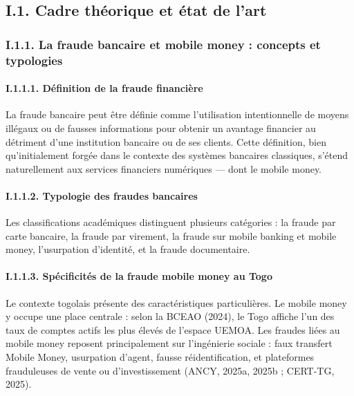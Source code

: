 \documentclass[
  12pt,
]{article}
\begin{document}
\subsection{I.1. Cadre théorique et état de
l’art}\label{i.1.-cadre-thuxe9orique-et-uxe9tat-de-lart}

\subsubsection{I.1.1. La fraude bancaire et mobile money : concepts et
typologies}\label{i.1.1.-la-fraude-bancaire-et-mobile-money-concepts-et-typologies}

\paragraph{I.1.1.1. Définition de la fraude
financière}\label{i.1.1.1.-duxe9finition-de-la-fraude-financiuxe8re}

La fraude bancaire peut être définie comme l’utilisation intentionnelle
de moyens illégaux ou de fausses informations pour obtenir un avantage
financier au détriment d’une institution bancaire ou de ses clients.
Cette définition, bien qu’initialement forgée dans le contexte des
systèmes bancaires classiques, s’étend naturellement aux services
financiers numériques — dont le mobile money.

\paragraph{I.1.1.2. Typologie des fraudes
bancaires}\label{i.1.1.2.-typologie-des-fraudes-bancaires}

Les classifications académiques distinguent plusieurs catégories : la
fraude par carte bancaire, la fraude par virement, la fraude sur mobile
banking et mobile money, l’usurpation d’identité, et la fraude
documentaire.

\paragraph{I.1.1.3. Spécificités de la fraude mobile money au
Togo}\label{i.1.1.3.-spuxe9cificituxe9s-de-la-fraude-mobile-money-au-togo}

Le contexte togolais présente des caractéristiques particulières. Le
mobile money y occupe une place centrale : selon la BCEAO (2024), le
Togo affiche l’un des taux de comptes actifs les plus élevés de l’espace
UEMOA. Les fraudes liées au mobile money reposent principalement sur
l’ingénierie sociale : faux transfert Mobile Money, usurpation d’agent,
fausse réidentification, et plateformes frauduleuses de vente ou
d’investissement (ANCY, 2025a, 2025b ; CERT-TG, 2025).
\end{document}
